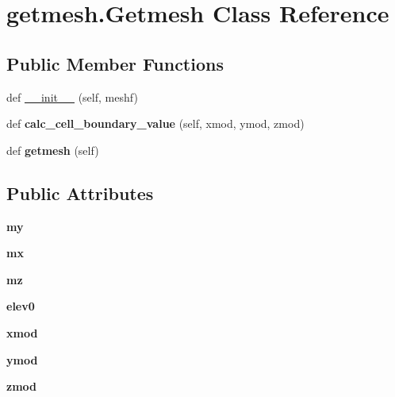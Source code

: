 \hypertarget{classgetmesh_1_1Getmesh}{}\section{getmesh.\+Getmesh Class Reference}
\label{classgetmesh_1_1Getmesh}
\subsection*{Public Member Functions}
\begin{DoxyCompactItemize}
\item 
def \hyperlink{classgetmesh_1_1Getmesh_ad96df31062e387cf0c847c7f35e7eee0}{\+\_\+\+\_\+init\+\_\+\+\_\+} (self, meshf)
\item 
\mbox{\label{classgetmesh_1_1Getmesh_a63f0ad135ebe8230e5c458269dfbc7c4}} 
def {\bfseries calc\+\_\+cell\+\_\+boundary\+\_\+value} (self, xmod, ymod, zmod)
\item 
\mbox{\label{classgetmesh_1_1Getmesh_ab38a5d97666c7fc714f43daaa0f34ce7}} 
def {\bfseries getmesh} (self)
\end{DoxyCompactItemize}
\subsection*{Public Attributes}
\begin{DoxyCompactItemize}
\item 
\mbox{\label{classgetmesh_1_1Getmesh_a62deb3d98a705b32ea5b16e27f53f035}} 
{\bfseries my}
\item 
\mbox{\label{classgetmesh_1_1Getmesh_aa3e4e41f007440110609e7402f8eaad3}} 
{\bfseries mx}
\item 
\mbox{\label{classgetmesh_1_1Getmesh_a2f37576d534f50bc44efad493a44ed1e}} 
{\bfseries mz}
\item 
\mbox{\label{classgetmesh_1_1Getmesh_a601b197de545c2635913d280f755975a}} 
{\bfseries elev0}
\item 
\mbox{\label{classgetmesh_1_1Getmesh_aa090f6fa0ba4d5e0b187f465006cd6be}} 
{\bfseries xmod}
\item 
\mbox{\label{classgetmesh_1_1Getmesh_a12f7864bec081f947659399dd5ae5c2f}} 
{\bfseries ymod}
\item 
\mbox{\label{classgetmesh_1_1Getmesh_ab94a938b2a2c61138083561f1bbe2058}} 
{\bfseries zmod}
\end{DoxyCompactItemize}


